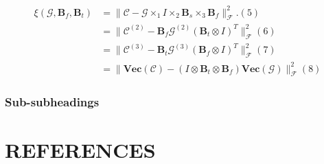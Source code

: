\documentclass{article}
\def\F{{\mathcal F}}
\def\G{\boldsymbol{{\mathscr G}}}
\def\C{\boldsymbol{{\mathscr C}}}
\def\B{{\mathbf B}}
\begin{document}
$$
\begin{aligned}
\xi(\G,\B_{f},\B_{t})&=\| \C - \G \times_1 I \times_2 \B_s \times_3 \B_f \|_{\F}^2.(5)\\
&=\| \C^{(2)} - \B_f \G^{(2)}(\B_t\otimes I)^{T} \|_{\F}^2(6)\\
&=\| \C^{(3)} - \B_t \G^{(3)}(\B_f\otimes I)^{T} \|_{\F}^2(7)\\
&=\| \textbf{Vec}(\C)-(I\otimes \B_t \otimes \B_f)\textbf{Vec}(\G)\|_{\F}^2(8)
\end{aligned}
$$
\subsubsection{Sub-subheadings}
\label{sssec:subsubhead}
 
 
 \section{REFERENCES}
 \label{sec:refs}
 
 
 
 
 
\end{document}
